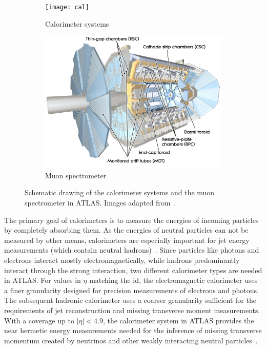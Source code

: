 \begin{figure}
	\centering
	\begin{subfigure}[b]{0.45\linewidth}
		\centering\texttt{[image: cal]}
		\caption{Calorimeter systems\label{fig:calorimeters}}
	\end{subfigure}%
	\begin{subfigure}[b]{0.45\linewidth}
		\centering\includegraphics[width=\textwidth]{ms}
		\caption{Muon spectrometer\label{fig:muon_system}}
	\end{subfigure}%
	\caption{Schematic drawing of the calorimeter systems and the muon spectrometer in ATLAS. Images adapted from~\cite{Pequenao:1095927,Pequenao:1095929}.}\label{fig:cal_ms_schematic}
\end{figure}

The primary goal of calorimeters is to measure the energies of incoming particles by completely absorbing them. As the energies of neutral particles can not be measured by other means, calorimeters are especially important for jet energy measurements (which contain neutral hadrons)~\cite{Brock:1354959}. Since particles like photons and electrons interact mostly electromagnetically, while hadrons predominantly interact through the strong interaction, two different calorimeter types are needed in ATLAS. For values in $\eta$ matching the \gls{id}, the electromagnetic calorimeter uses a finer granularity designed for precision measurements of electrons and photons. The subsequent hadronic calorimeter uses a coarser granularity sufficient for the requirements of jet reconstruction and missing transverse moment measurements. With a coverage up to $\vert\eta\vert <4.9$, the calorimeter system in ATLAS provides the near hermetic energy measurements needed for the inference of missing transverse momentum created by neutrinos and other weakly interacting neutral particles~\cite{Aad:2008zzm}.

